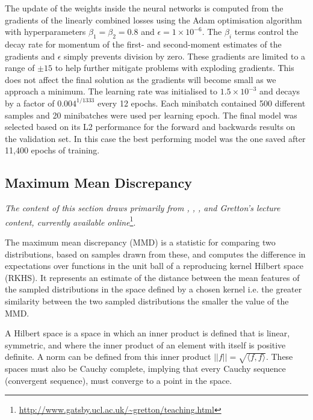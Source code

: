 The update of the weights inside the neural networks is computed from the gradients of the linearly combined losses using the Adam optimisation algorithm \citep{2014Kingma} with hyperparameters $\beta_1=\beta_2=0.8$ and $\epsilon=1\times10^{-6}$.
The $\beta_i$ terms control the decay rate for momentum of the first- and second-moment estimates of the gradients and $\epsilon$ simply prevents division by zero.
These gradients are limited to a range of $\pm15$ to help further mitigate problems with exploding gradients.
This does not affect the final solution as the gradients will become small as we approach a minimum.
The learning rate was initialised to $1.5\times10^{-3}$ and decays by a factor of $0.004^{1/1333}$ every 12 epochs.
Each minibatch contained 500 different samples and 20 minibatches were used per learning epoch.
The final model was selected based on its L2 performance for the forward and backwards results on the validation set.
In this case the best performing model was the one saved after 11,400 epochs of training.


\subsection{Maximum Mean Discrepancy}\label{Sec:Mmd}

\emph{The content of this section draws primarily from \citet{Sriperumbudur2009}, \citet{2012Gretton}, \citet{Muandet2017}, and Gretton's lecture content, currently available online}\footnote{\url{http://www.gatsby.ucl.ac.uk/~gretton/teaching.html}}.

The maximum mean discrepancy (MMD) is a statistic for comparing two distributions, based on samples drawn from these, and computes the difference in expectations over functions in the unit ball of a reproducing kernel Hilbert space (RKHS).
It represents an estimate of the distance between the mean features of the sampled distributions in the space defined by a chosen kernel i.e. the greater similarity between the two sampled distributions the smaller the value of the MMD.

A Hilbert space is a space in which an inner product is defined that is linear, symmetric, and where the inner product of an element with itself is positive definite.
A norm can be defined from this inner product $||f|| = \sqrt{\langle f, f \rangle}$.
These spaces must also be Cauchy complete, implying that every Cauchy sequence (convergent sequence), must converge to a point in the space.

